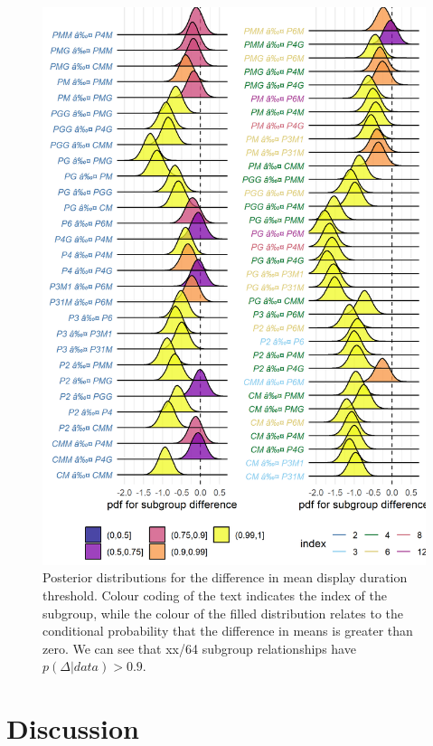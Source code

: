 \documentclass[9pt,twocolumn,twoside,lineno]{pnas-new}
\begin{document}
\begin{figure}[tbh]
\centering
\includegraphics[width=1\linewidth]{../analysis/plots/subgroup_comp_psychophysical.png}
\caption{Posterior distributions for the difference in mean display duration threshold. Colour coding of the text indicates the index of the subgroup, while the colour of the filled distribution relates to the conditional probability that the difference in means is greater than zero. We can see that xx/64 subgroup relationships have $p(\Delta|data)>0.9$.}
\label{fig:durations_comp}
\end{figure}

\section*{Discussion}
\end{document}
